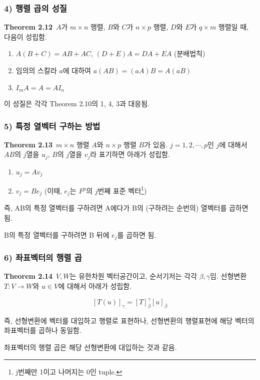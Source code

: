 \subsubsection*{4) 행렬 곱의 성질}
\textbf{Theorem 2.12}\, $A$가 $m \times n$ 행렬, $B$와 $C$가 $n \times p$ 행렬, $D$와 $E$가 $q \times m$ 행렬일 때, 다음이 성립함.

\begin{enumerate}
    \item $A(B+C)=AB+AC,\,(D+E)A=DA+EA$ (분배법칙)
    \item 임의의 스칼라 $a$에 대하여 $a(AB)=(aA)B=A(aB)$
    \item $I_{m}A=A=AI_{n}$
\end{enumerate}

이 성질은 각각 Theorem 2.10의 1, 4, 3과 대응됨.

\subsubsection*{5) 특정 열벡터 구하는 방법}
\textbf{Theorem 2.13}\, $m \times n$ 행렬 $A$와 $n \times p$ 행렬 $B$가 있음. $j=1,2, \cdots ,p$인 $j$에 대해서 $AB$의 $j$열을 $u_j$, $B$의 $j$열을 $v_j$라 표기하면 아래가 성립함.

\begin{enumerate}
    \item $u_j=Av_j$
    \item $v_j=Be_j$ (이때, $e_j$는 $F^p$의 $j$번째 표준 벡터\footnote{j번째만 1이고 나머지는 0인 tuple.})
\end{enumerate}

즉, AB의 특정 열벡터를 구하려면 A에다가 B의 (구하려는 순번의) 열벡터를 곱하면 됨.

B의 특정 열벡터를 구하려면 B 뒤에 $e_j$를 곱하면 됨.


\newpage


\subsubsection*{6) 좌표벡터의 행렬 곱}
\textbf{Theorem 2.14}\, $V,W$는 유한차원 벡터공간이고, 순서기저는 각각 $\beta, \gamma$임. 선형변환 $T:V \rightarrow W$와 $u \in V$에 대해서 아래가 성립함.

\[
[T(u)]_{\gamma}=[T]_{\beta}^{\gamma}[u]_{\beta}
\]

즉, 선형변환에 벡터를 대입하고 행렬로 표현하나, 선형변환의 행렬표현에 해당 벡터의 좌표벡터를 곱하나 동일함.

좌표벡터의 행렬 곱은 해당 선형변환에 대입하는 것과 같음.

